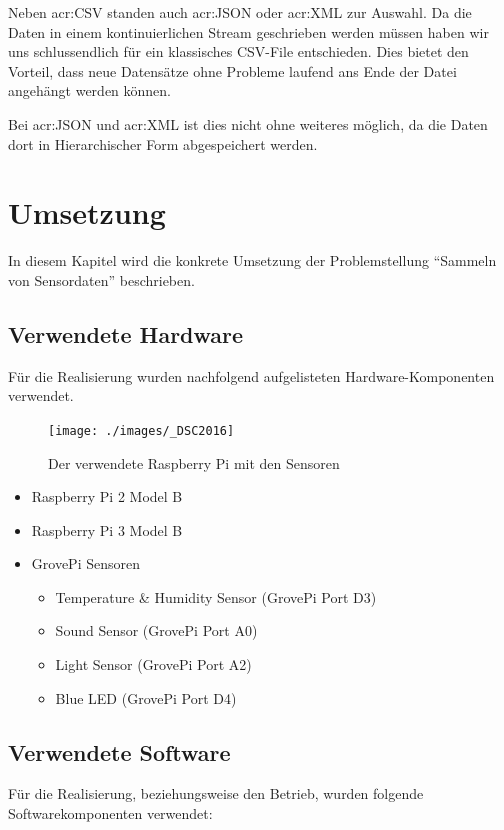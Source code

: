 Neben \gls{acr:CSV} standen auch \gls{acr:JSON} oder \gls{acr:XML} zur Auswahl. Da die Daten in einem kontinuierlichen Stream geschrieben werden müssen haben wir uns schlussendlich für ein klassisches CSV-File entschieden. Dies bietet den Vorteil, dass neue Datensätze ohne Probleme laufend ans Ende der Datei angehängt werden können.

Bei \gls{acr:JSON} und \gls{acr:XML} ist dies nicht ohne weiteres möglich, da die Daten dort in Hierarchischer Form abgespeichert werden.


\section{Umsetzung}
In diesem Kapitel wird die konkrete Umsetzung der Problemstellung "`Sammeln von Sensordaten"' beschrieben.

\subsection{Verwendete Hardware}
Für die Realisierung wurden nachfolgend aufgelisteten Hardware-Komponenten verwendet.

\begin{figure}[H]
  \centering
  \texttt{[image: ./images/\_DSC2016]}
  \caption{Der verwendete Raspberry Pi mit den Sensoren}
\end{figure}

\begin{itemize}
\item Raspberry Pi 2 Model B
\item Raspberry Pi 3 Model B
\item GrovePi Sensoren
\begin{itemize}
\item Temperature \& Humidity Sensor (GrovePi Port D3)
\item Sound Sensor (GrovePi Port A0)
\item Light Sensor (GrovePi Port A2)
\item Blue LED (GrovePi Port D4)
\end{itemize}
\end{itemize}




\subsection{Verwendete Software}
Für die Realisierung, beziehungsweise den Betrieb, wurden folgende Softwarekomponenten verwendet:

